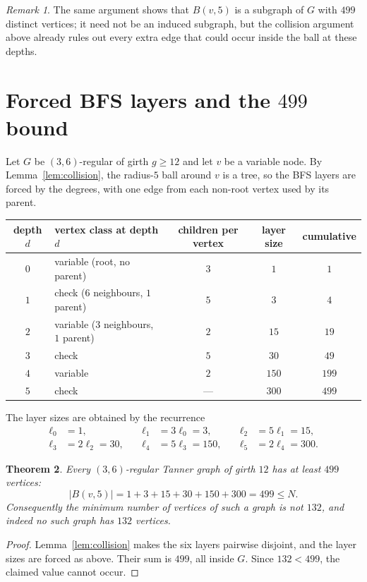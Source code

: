 \documentclass[11pt]{article}
\newtheorem{theorem}{Theorem}
\theoremstyle{definition}
\theoremstyle{remark}
\newtheorem{remark}[theorem]{Remark}
\newcommand{\Ball}{B}
\begin{document}
\begin{remark}
The same argument shows that $\Ball(v,5)$ is a subgraph of $G$ with $499$
distinct vertices; it need not be an induced subgraph, but the collision
argument above already rules out every extra edge that could occur inside the
ball at these depths.
\end{remark}

\section{Forced BFS layers and the $499$ bound}

Let $G$ be $(3,6)$-regular of girth $g\ge 12$ and let $v$ be a variable node.
By Lemma~\ref{lem:collision}, the radius-$5$ ball around $v$ is a tree, so the
BFS layers are forced by the degrees, with one edge from each non-root vertex
used by its parent.

\begin{center}
\begin{tabular}{c l c c c}
\toprule
depth $d$ & vertex class at depth $d$ & children per vertex & layer size & cumulative\\
\midrule
$0$ & variable (root, no parent)          & $3$   & $1$   & $1$\\
$1$ & check ($6$ neighbours, $1$ parent)  & $5$   & $3$   & $4$\\
$2$ & variable ($3$ neighbours, $1$ parent)& $2$   & $15$  & $19$\\
$3$ & check                               & $5$   & $30$  & $49$\\
$4$ & variable                            & $2$   & $150$ & $199$\\
$5$ & check                               & ---   & $300$ & $499$\\
\bottomrule
\end{tabular}
\end{center}

The layer sizes are obtained by the recurrence
\[
\begin{aligned}
\ell_0&=1, &\quad \ell_1&=3\ell_0=3, &\quad \ell_2&=5\ell_1=15,\\
\ell_3&=2\ell_2=30, &\quad \ell_4&=5\ell_3=150, &\quad \ell_5&=2\ell_4=300.
\end{aligned}
\]

\begin{theorem}\label{thm:499}
Every $(3,6)$-regular Tanner graph of girth $12$ has at least $499$ vertices:
\[
|\Ball(v,5)|=1+3+15+30+150+300=499\le N .
\]
Consequently the minimum number of vertices of such a graph is not $132$, and
indeed no such graph has $132$ vertices.
\end{theorem}
\begin{proof}
Lemma~\ref{lem:collision} makes the six layers pairwise disjoint, and the
layer sizes are forced as above. Their sum is $499$, all inside $G$. Since
$132<499$, the claimed value cannot occur.
\end{proof}
\end{document}
